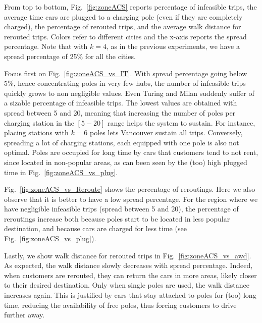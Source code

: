 From top to bottom, Fig.~\ref{fig:zoneACS} reports percentage of infeasible trips, the average time cars are plugged to a charging pole (even if they are completely charged), the percentage of rerouted trips,  and the average walk distance for rerouted trips. 
Colors refer to different cities and the x-axis reports the spread percentage. 
Note that with $k=4$, as in the previous experiments, we have a spread percentage of 25\% for all the cities.


Focus first on Fig.~\ref{fig:zoneACS_vs_IT}. With spread percentage going below 5\%, hence concentrating poles in very few hubs, the number of infeasible  trips quickly grows to non negligible values. Even Turing and Milan suddenly suffer of a sizable percentage of infeasible trips.
The lowest values are obtained with spread between 5 and 20, meaning that increasing the number of poles per charging station in the $[5-20]$ range helps the system to sustain.
For instance, placing stations with $k=6$ poles lets Vancouver sustain all trips. 
Conversely, spreading a lot of charging stations, each equipped with one pole is also not optimal. Poles are occupied for long time by cars that customers tend to not rent, since located in non-popular areas, as can been seen by the (too) high plugged time in Fig.~\ref{fig:zoneACS_vs_plug}.


Fig.~\ref{fig:zoneACS_vs_Reroute} shows the percentage of reroutings. Here we also observe that it is better to have a low spread percentage.
For the region where we have negligible infeasible trips (spread between 5 and 20), the percentage of reroutings increase both because poles start to be located in less popular destination, and because cars are charged for less time (see Fig.~\ref{fig:zoneACS_vs_plug}).

Lastly, we show walk distance for rerouted trips in Fig.~\ref{fig:zoneACS_vs_awd}. As expected, the walk distance slowly decreases with spread percentage. Indeed, when customers are rerouted, they can return the cars in more areas, likely closer to their desired destination. Only when single poles are used, the walk distance increases again. This is justified by cars that stay attached to poles for (too) long time, reducing the availability of free poles, thus forcing customers to drive further away.

